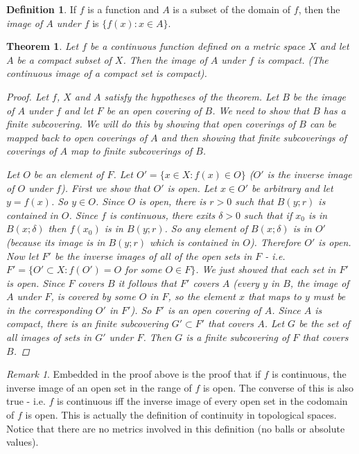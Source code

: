 \documentclass[11pt,a4paper]{report}
\theoremstyle{plain}
\newtheorem{thm}{Theorem}[section]
\theoremstyle{definition}
\newtheorem{defn}{Definition}[section]
\theoremstyle{remark}
\newtheorem*{rem}{Remark}
\begin{document}
\begin{defn}
If $f$ is a function and $A$ is a subset of the domain of $f$, then the \textit{image of $A$ under $f$} is $\{f(x) \colon x \in A\}$. 
\end{defn}
\begin{thm}
Let $f$ be a continuous function defined on a metric space $X$ and let $A$ be a compact subset of $X$.  Then the image of $A$ under $f$ is compact.  (The continuous image of a compact set is compact).
\begin{proof}
Let $f$, $X$ and $A$ satisfy the hypotheses of the theorem. Let $B$ be the image of $A$ under $f$ and let $F$ be an open covering of $B$. We need to show that $B$ has a finite subcovering. We will do this by showing that open coverings of $B$ can be mapped back to open coverings of $A$ and then showing that finite subcoverings of coverings of $A$ map to finite subcoverings of $B$.

Let $O$ be an element of $F$. Let $O' = \{x \in X \colon f(x) \in O\}$ ($O'$ is the \textit{inverse image} of $O$ under $f$).  First we show that $O'$ is open. Let $x \in O'$ be arbitrary and let $y = f(x)$. So $y \in O$. Since $O$ is open, there is $r>0$ such that $B(y;r)$ is contained in $O$. Since $f$ is continuous, there exits $\delta>0$ such that if $x_0$ is in $B(x;\delta)$ then $f(x_0)$ is in $B(y;r)$.  So any element of $B(x;\delta)$ is in $O'$ (because its image is in $B(y;r)$ which is contained in $O$). Therefore $O'$ is open.  Now let $F'$ be the inverse images of all of the open sets in $F$ - i.e. $F' = \{O' \subset X \colon f(O') = O$ for some $O \in F\}$.  We just showed that each set in $F'$ is open. Since $F$ covers $B$ it follows that $F'$ covers $A$ (every $y$ in $B$, the image of $A$ under $F$, is covered by some $O$ in $F$, so the element $x$ that maps to $y$ must be in the corresponding $O'$ in $F'$). So $F'$ is an open covering of $A$.  Since $A$ is compact, there is an finite subcovering $G' \subset F'$ that covers $A$.  Let $G$ be the set of all images of sets in $G'$ under $F$.  Then $G$ is a finite subcovering of $F$ that covers $B$.
\end{proof}
\end{thm}
\begin{rem}
Embedded in the proof above is the proof that if $f$ is continuous, the inverse image of an open set in the range of $f$ is open. The converse of this is also true - i.e. $f$ is continuous iff the inverse image of every open set in the codomain of $f$ is open.  This is actually the definition of continuity in topological spaces.  Notice that there are no metrics involved in this definition (no balls or absolute values).
\end{rem}
\end{document}
